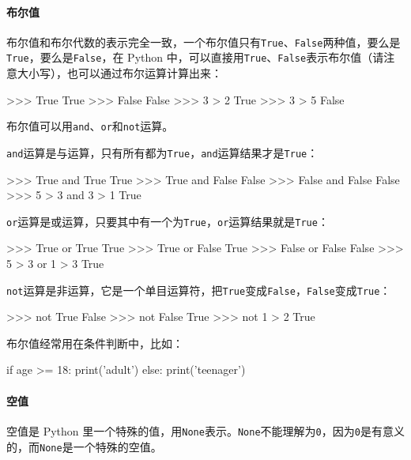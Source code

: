 \hypertarget{ux5e03ux5c14ux503c}{%
\paragraph{布尔值}\label{ux5e03ux5c14ux503c}}

布尔值和布尔代数的表示完全一致，一个布尔值只有\texttt{True}、\texttt{False}两种值，要么是\texttt{True}，要么是\texttt{False}，在
Python
中，可以直接用\texttt{True}、\texttt{False}表示布尔值（请注意大小写），也可以通过布尔运算计算出来：

\begin{pythoncode}
>>> True
True
>>> False
False
>>> 3 > 2
True
>>> 3 > 5
False
\end{pythoncode}

布尔值可以用\texttt{and}、\texttt{or}和\texttt{not}运算。

\texttt{and}运算是与运算，只有所有都为\texttt{True}，\texttt{and}运算结果才是\texttt{True}：

\begin{pythoncode}
>>> True and True
True
>>> True and False
False
>>> False and False
False
>>> 5 > 3 and 3 > 1
True
\end{pythoncode}

\texttt{or}运算是或运算，只要其中有一个为\texttt{True}，\texttt{or}运算结果就是\texttt{True}：

\begin{pythoncode}
>>> True or True
True
>>> True or False
True
>>> False or False
False
>>> 5 > 3 or 1 > 3
True
\end{pythoncode}

\texttt{not}运算是非运算，它是一个单目运算符，把\texttt{True}变成\texttt{False}，\texttt{False}变成\texttt{True}：

\begin{pythoncode}
>>> not True
False
>>> not False
True
>>> not 1 > 2
True
\end{pythoncode}

布尔值经常用在条件判断中，比如：

\begin{pythoncode}
if age >= 18:
    print('adult')
else:
    print('teenager')
\end{pythoncode}

\hypertarget{ux7a7aux503c}{%
\paragraph{空值}\label{ux7a7aux503c}}

空值是 Python
里一个特殊的值，用\texttt{None}表示。\texttt{None}不能理解为\texttt{0}，因为\texttt{0}是有意义的，而\texttt{None}是一个特殊的空值。


